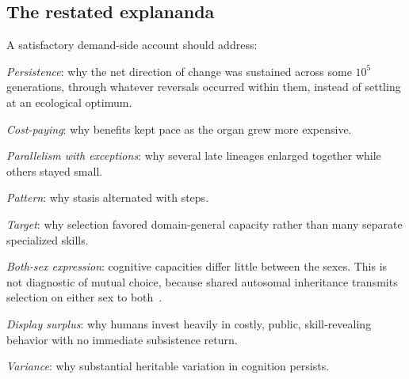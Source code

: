 \subsection{The restated explananda}

A satisfactory demand-side account should address:
\begin{description}[leftmargin=2.1em,labelwidth=1.6em,labelsep=0.5em,itemsep=0.5pt,font=\sffamily\bfseries\footnotesize]
\item[Q1] \emph{Persistence}: why the net direction of change was sustained across some $10^{5}$ generations, through whatever
reversals occurred within them, instead of settling at an ecological optimum.
\item[Q2] \emph{Cost-paying}: why benefits kept pace as the organ grew more expensive.
\item[Q3] \emph{Parallelism with exceptions}: why several late lineages enlarged together while others stayed small.
\item[Q4] \emph{Pattern}: why stasis alternated with steps.
\item[Q5] \emph{Target}: why selection favored domain-general capacity rather than many separate specialized skills.
\item[Q6] \emph{Both-sex expression}: cognitive capacities differ little between the sexes. This is not diagnostic of mutual
choice, because shared autosomal inheritance transmits selection on either sex to both~\cite{lande1980}.
\item[Q7] \emph{Display surplus}: why humans invest heavily in costly, public, skill-revealing behavior with no immediate
subsistence return.
\item[Q8] \emph{Variance}: why substantial heritable variation in cognition persists.
\end{description}
